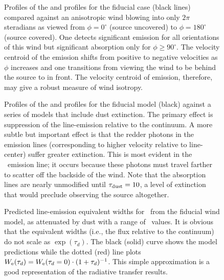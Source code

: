 \documentclass[12pt,preprint]{aastex}
\begin{document}
\begin{figure}
\caption{
Profiles of the  and  profiles for the fiducial
case (black lines) compared against an anisotropic wind blowing into
only $2\pi$ steradians as viewed from $\phi = 0^\circ$ (source
uncovered) to $\phi = 180^\circ$ (source covered).  One detects
significant emission for all orientations of this wind but significant
absorption only for $\phi \ge 90^\circ$.
The velocity centroid of the 
emission shifts from positive to negative velocities as $\phi$
increases and one transitions from viewing the wind to be behind the
source to in front.  The velocity centroid of emission, therefore, may
give a robust measure of wind isotropy.
}
\label{fig:anisotropic}
\end{figure}

\begin{figure}
\caption{
Profiles of the  and  profiles for the fiducial
model (black) against a series of models that include 
dust extinction.  The primary effect is suppression of
the line-emission relative to the continuum. 
A more subtle but important effect is that the redder photons in the
emission lines (corresponding to higher velocity relative to
line-center) suffer greater extinction.  This is most evident in the
\feiic\ emission line; it occurs because these photons must
travel farther to scatter off the backside of the wind.  Note that
the absorption lines are nearly unmodified until $\tau_{\rm dust} = 10$, a
level of extinction that would preclude observing the source
altogether.
}
\label{fig:dust}
\end{figure}

\begin{figure}
\caption{
Predicted line-emission equivalent widths for \mgiib\ from the
fiducial wind model, as attenuated by dust with a range of \taud\
values.  
It is obvious that the equivalent widths (i.e., the flux relative to
the continuum) do not scale as $\exp(\tau_d)$.
The black (solid) curve shows the model predictions while the
dotted (red) line plots $W_{\rm e}(\tau_d) = W_{\rm e}(\tau_d = 0)
\cdot (1+\tau_d)^{-1}$.  This simple approximation is a good
representation of the radiative transfer results.   
}
\label{fig:dust_tau}
\end{figure}
\end{document}
